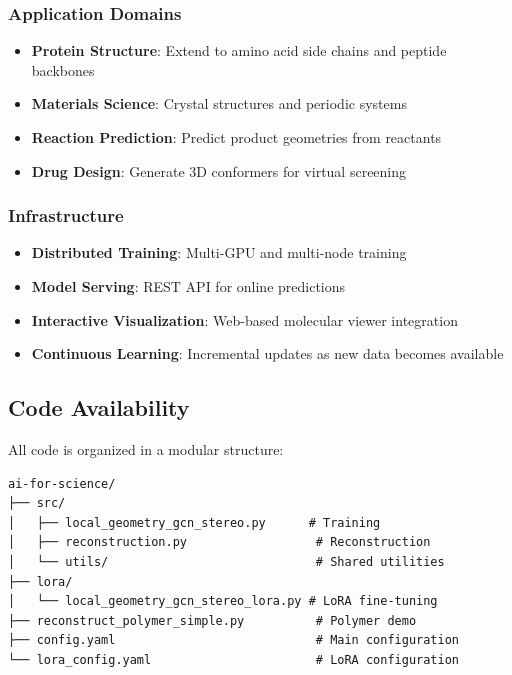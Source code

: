 \documentclass[11pt,a4paper]{article}
\begin{document}
\subsubsection{Application Domains}

\begin{itemize}
    \item \textbf{Protein Structure}: Extend to amino acid side chains and peptide backbones
    \item \textbf{Materials Science}: Crystal structures and periodic systems
    \item \textbf{Reaction Prediction}: Predict product geometries from reactants
    \item \textbf{Drug Design}: Generate 3D conformers for virtual screening
\end{itemize}

\subsubsection{Infrastructure}

\begin{itemize}
    \item \textbf{Distributed Training}: Multi-GPU and multi-node training
    \item \textbf{Model Serving}: REST API for online predictions
    \item \textbf{Interactive Visualization}: Web-based molecular viewer integration
    \item \textbf{Continuous Learning}: Incremental updates as new data becomes available
\end{itemize}

\subsection{Code Availability}

All code is organized in a modular structure:

\begin{verbatim}
ai-for-science/
├── src/
│   ├── local_geometry_gcn_stereo.py      # Training
│   ├── reconstruction.py                  # Reconstruction
│   └── utils/                             # Shared utilities
├── lora/
│   └── local_geometry_gcn_stereo_lora.py # LoRA fine-tuning
├── reconstruct_polymer_simple.py          # Polymer demo
├── config.yaml                            # Main configuration
└── lora_config.yaml                       # LoRA configuration
\end{verbatim}
\end{document}
